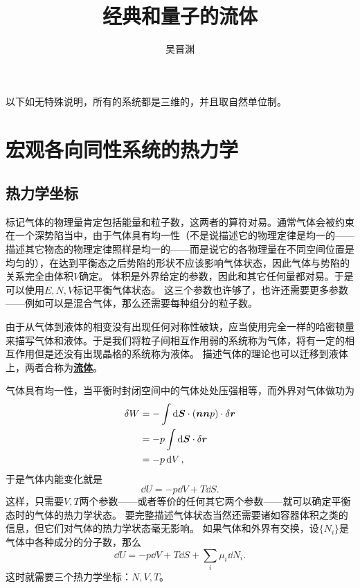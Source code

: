 \documentclass[hyperref, UTF8, a4paper]{ctexart}
\title{经典和量子的流体}
\author{吴晋渊}
\newcommand{\concept}[1]{\underline{\textbf{#1}}}
\begin{document}
\maketitle

以下如无特殊说明，所有的系统都是三维的，并且取自然单位制。

\section{宏观各向同性系统的热力学}

\subsection{热力学坐标}

标记气体的物理量肯定包括能量和粒子数，这两者的算符对易。通常气体会被约束在一个深势陷当中，由于气体具有均一性（不是说描述它的物理定律是均一的——描述其它物态的物理定律照样是均一的——而是说它的各物理量在不同空间位置是均匀的），在达到平衡态之后势陷的形状不应该影响气体状态，因此气体与势陷的关系完全由体积$V$确定。
体积是外界给定的参数，因此和其它任何量都对易。于是可以使用$E, N, V$标记平衡气体状态。
这三个参数也许够了，也许还需要更多参数——例如可以是混合气体，那么还需要每种组分的粒子数。

由于从气体到液体的相变没有出现任何对称性破缺，应当使用完全一样的哈密顿量来描写气体和液体。于是我们将粒子间相互作用弱的系统称为气体，将有一定的相互作用但是还没有出现晶格的系统称为液体。
描述气体的理论也可以迁移到液体上，两者合称为\concept{流体}。

气体具有均一性，当平衡时封闭空间中的气体处处压强相等，而外界对气体做功为
\[
    \begin{aligned}
        \var{W} &= - \int \dd{\vb*{S}} \cdot (\vb*{n} \vb*{n} p) \cdot \var{\vb*{r}} \\
        &= - p \int \dd{\vb*{S}} \cdot \var{\vb*{r}} \\
        &= - p \dd{V}, 
    \end{aligned}
\]
于是气体内能变化就是
\begin{equation}
    \dd{U} = -p \dd{V} + T \dd{S}.
    \label{eq:first-law-of-gas}
\end{equation}
这样，只需要$V, T$两个参数——或者等价的任何其它两个参数——就可以确定平衡态时的气体的热力学状态。
要完整描述气体状态当然还需要诸如容器体积之类的信息，但它们对气体的热力学状态毫无影响。
如果气体和外界有交换，设$\{N_i\}$是气体中各种成分的分子数，那么
\begin{equation}
    \dd{U} = -p \dd{V} + T \dd{S} + \sum_i \mu_i \dd{N_i}.
    \label{eq:first-law-of-gas-extended}
\end{equation}
这时就需要三个热力学坐标：$N, V, T$。
\end{document}
